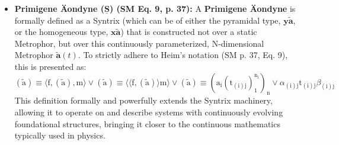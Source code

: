 \documentclass[12pt]{article}
\newcommand{\syntrix}{\bm{y\widetilde{a}}}
\newcommand{\homogeneoussyntrix}{\bm{x\widetilde{a}}}
\newcommand{\metrophor}{\bm{\widetilde{a}}}
\begin{document}
\begin{itemize}
    \item \textbf{Primigene Äondyne (\( \underline{\bm{S}} \)) (SM Eq. 9, p. 37):}
    A \textbf{Primigene \"{A}ondyne} is formally defined as a Syntrix (which can be of either the pyramidal type, \( \syntrix \), or the homogeneous type, \( \homogeneoussyntrix \)) that is constructed not over a static Metrophor, but over this continuously parameterized, N-dimensional Metrophor \( \metrophor(t) \). To strictly adhere to Heim's notation (SM p. 37, Eq. 9), this is presented as:
        \begin{equation}
        (\tilde{\mathrm{a}}) \equiv \langle \mathrm{f}, (\tilde{\mathrm{a}}), \mathrm{m} \rangle \lor (\tilde{\mathrm{a}}) \equiv \langle\langle \mathrm{f}, (\tilde{\mathrm{a}}) \rangle \mathrm{m} \rangle \lor (\tilde{\mathrm{a}}) \equiv (\mathrm{a}_{\mathrm{i}}(\mathrm{t}_{(\mathrm{i})\mathrm{j}})_1^{\mathrm{n}_{\mathrm{i}}})_{\mathrm{n}} \lor \alpha_{(\mathrm{i})\mathrm{j}} \mathrm{t}_{(\mathrm{i})\mathrm{j}} \beta_{(\mathrm{i})\mathrm{j}} \tag{9}
        \label{eq:original_primigene_aeondyne}
        \end{equation}
    This definition formally and powerfully extends the Syntrix machinery, allowing it to operate on and describe systems with continuously evolving foundational structures, bringing it closer to the continuous mathematics typically used in physics.


\end{itemize}
\end{document}
